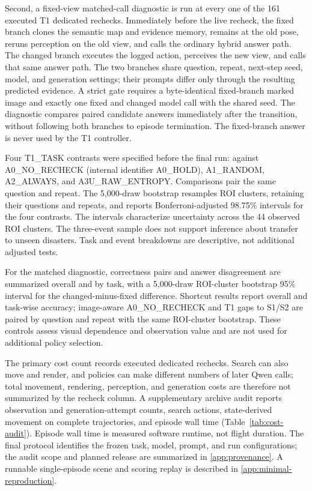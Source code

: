Second, a fixed-view matched-call diagnostic is run at every one of the 161 executed T1 dedicated rechecks. Immediately before the live recheck, the fixed branch clones the semantic map and evidence memory, remains at the old pose, reruns perception on the old view, and calls the ordinary hybrid answer path. The changed branch executes the logged action, perceives the new view, and calls that same answer path. The two branches share question, repeat, next-step seed, model, and generation settings; their prompts differ only through the resulting predicted evidence. A strict gate requires a byte-identical fixed-branch marked image and exactly one fixed and changed model call with the shared seed. The diagnostic compares paired candidate answers immediately after the transition, without following both branches to episode termination. The fixed-branch answer is never used by the T1 controller.

Four T1\_TASK contrasts were specified before the final run: against A0\_NO\_RECHECK (internal identifier A0\_HOLD), A1\_RANDOM, A2\_ALWAYS, and A3U\_RAW\_ENTROPY. Comparisons pair the same question and repeat. The 5,000-draw bootstrap resamples ROI clusters, retaining their questions and repeats, and reports Bonferroni-adjusted 98.75\% intervals for the four contrasts. The intervals characterize uncertainty across the 44 observed ROI clusters. The three-event sample does not support inference about transfer to unseen disasters. Task and event breakdowns are descriptive, not additional adjusted tests.

For the matched diagnostic, correctness pairs and answer disagreement are summarized overall and by task, with a 5,000-draw ROI-cluster bootstrap 95\% interval for the changed-minus-fixed difference. Shortcut results report overall and task-wise accuracy; image-aware A0\_NO\_RECHECK and T1 gaps to S1/S2 are paired by question and repeat with the same ROI-cluster bootstrap. These controls assess visual dependence and observation value and are not used for additional policy selection.

The primary cost count records executed dedicated rechecks. Search can also move and render, and policies can make different numbers of later Qwen calls; total movement, rendering, perception, and generation costs are therefore not summarized by the recheck column. A supplementary archive audit reports observation and generation-attempt counts, search actions, state-derived movement on complete trajectories, and episode wall time (Table~\ref{tab:cost-audit}). Episode wall time is measured software runtime, not flight duration. The final protocol identifies the frozen task, model, prompt, and run configurations; the audit scope and planned release are summarized in \ref{app:provenance}. A runnable single-episode scene and scoring replay is described in \ref{app:minimal-reproduction}.
